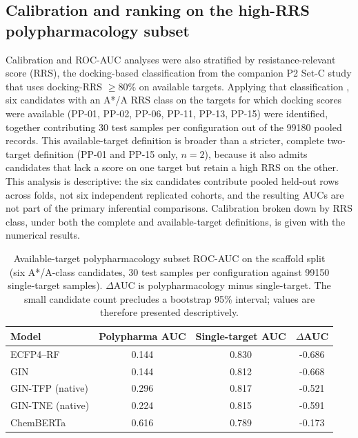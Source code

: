 \documentclass[11pt,a4paper]{article}
\begin{document}
\subsection{Calibration and ranking on the high-RRS polypharmacology subset}
\label{sec:polypharma_si}

Calibration and ROC-AUC analyses were also stratified by resistance-relevant score (RRS), the docking-based classification from the companion P2 Set-C study that uses docking-RRS $\ge 80\%$ on available targets. Applying that classification \citep{temgoua2027md}, six candidates with an A*/A RRS class on the targets for which docking scores were available (PP-01, PP-02, PP-06, PP-11, PP-13, PP-15) were identified, together contributing \num{30} test samples per configuration out of the \num{99180} pooled records. This available-target definition is broader than a stricter, complete two-target definition (PP-01 and PP-15 only, $n=2$), because it also admits candidates that lack a score on one target but retain a high RRS on the other. This analysis is descriptive: the six candidates contribute pooled held-out rows across folds, not six independent replicated cohorts, and the resulting AUCs are not part of the primary inferential comparisons. Calibration broken down by RRS class, under both the complete and available-target definitions, is given with the numerical results.

\begin{table}[h]
\centering
\caption{Available-target polypharmacology subset ROC-AUC on the scaffold split (six A*/A-class candidates, \num{30} test samples per configuration against \num{99150} single-target samples). $\Delta$AUC is polypharmacology minus single-target. The small candidate count precludes a bootstrap 95\% interval; values are therefore presented descriptively.}
\label{tab:s2_polypharma_available}
\small
\begin{tabular}{l S[table-format=1.3] S[table-format=1.3] S[table-format=-1.3]}
\toprule
Model & {Polypharma AUC} & {Single-target AUC} & {$\Delta$AUC} \\
\midrule
ECFP4--RF & \num{0.144} & \num{0.830} & -0.686 \\
GIN & 0.144 & 0.812 & -0.668 \\
GIN-TFP (native) & 0.296 & 0.817 & -0.521 \\
GIN-TNE (native) & 0.224 & 0.815 & -0.591 \\
ChemBERTa & 0.616 & 0.789 & -0.173 \\
\bottomrule
\end{tabular}
\end{table}
\end{document}
